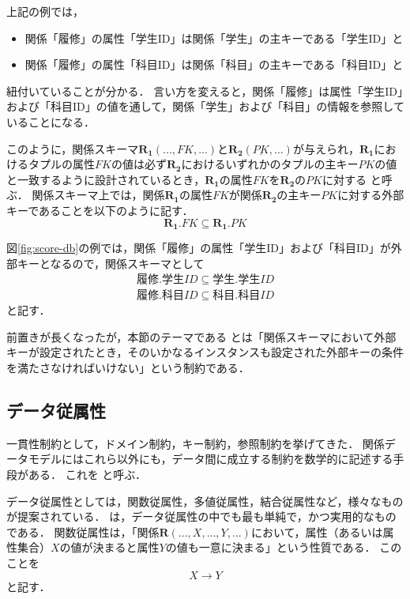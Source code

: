 上記の例では，
\begin{itemize}
\item 関係「履修」の属性「学生ID」は関係「学生」の主キーである「学生ID」と
\item 関係「履修」の属性「科目ID」は関係「科目」の主キーである「科目ID」と
\end{itemize}

紐付いていることが分かる．
言い方を変えると，関係「履修」は属性「学生ID」および「科目ID」の値を通して，関係「学生」および「科目」の情報を参照していることになる．

このように，関係スキーマ$\boldsymbol{R_1}(..., FK, ...)$と$\boldsymbol{R_2}(\underline{PK}, ...)$が与えられ，$\boldsymbol{R_1}$におけるタプルの属性$FK$の値は必ず$\boldsymbol{R_2}$におけるいずれかのタプルの主キー$PK$の値と一致するように設計されているとき，$\boldsymbol{R_1}$の属性$FK$を$\boldsymbol{R_2}$の$PK$に対する と呼ぶ．
関係スキーマ上では，関係$\boldsymbol{R_1}$の属性$FK$が関係$\boldsymbol{R_2}$の主キー$PK$に対する外部キーであることを以下のように記す．
\begin{equation}
\boldsymbol{R_1}.FK \subseteq \boldsymbol{R_1}.PK
\end{equation}

図\ref{fig:score-db}の例では，関係「履修」の属性「学生ID」および「科目ID」が外部キーとなるので，関係スキーマとして
\begin{eqnarray}
履修.学生ID \subseteq 学生.学生ID \\
履修.科目ID \subseteq 科目.科目ID
\end{eqnarray}
と記す．

前置きが長くなったが，本節のテーマである とは「関係スキーマにおいて外部キーが設定されたとき，そのいかなるインスタンスも設定された外部キーの条件を満たさなければいけない」という制約である．

\subsection{データ従属性}
一貫性制約として，ドメイン制約，キー制約，参照制約を挙げてきた．
関係データモデルにはこれら以外にも，データ間に成立する制約を数学的に記述する手段がある．
これを と呼ぶ．

データ従属性としては，関数従属性，多値従属性，結合従属性など，様々なものが提案されている．
 は，データ従属性の中でも最も単純で，かつ実用的なものである．
関数従属性は，「関係$\boldsymbol{R}(..., X, ..., Y, ...)$において，属性（あるいは属性集合）$X$の値が決まると属性$Y$の値も一意に決まる」という性質である．
このことを
\begin{equation}
X \to Y
\end{equation}
と記す．

